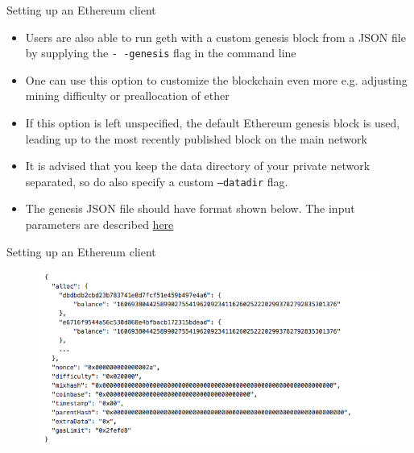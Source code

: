 \documentclass[9pt]{beamer}
\begin{document}

\begin{frame}{Setting up an Ethereum client}
	\begin{itemize}
		\item Users are also able to run geth with a custom genesis block from a JSON file by supplying the \texttt{- -genesis} flag in the command line
		\item  One can use this option to customize the blockchain even more e.g. adjusting mining difficulty or preallocation of ether
		\item If this option is left unspecified, the default Ethereum genesis block is used, leading up to the most recently published block on the main network
		\item It is advised that you keep the data directory of your private network separated, so do also specify a custom \texttt{---datadir} flag.
		\item The genesis JSON file should have format shown below. The input parameters are described \href{https://github.com/qobolwakhe/MSc2018/wiki/Genesis-Block}{here}
	\end{itemize}
\end{frame}


\begin{frame}{Setting up an Ethereum client}
		\begin{figure}[]
			\centering
			\includegraphics  [scale=0.4]{Images/geth2}
		\end{figure}
\end{frame}

\end{document}
